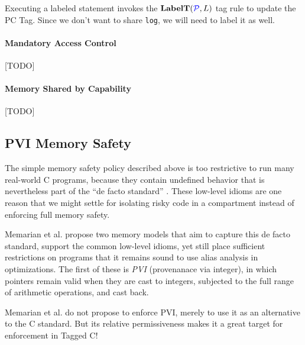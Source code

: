 \documentclass[acmsmall,review,anonymous]{acmart}\settopmatter{printfolios=true,printccs=false,printacmref=false}
\begin{document}
Executing a labeled statement invokes the \(\mathbf{LabelT}(\mathcal{\color{blue} P}, L)\) tag rule to update the PC Tag.
Since we don't want to share {\tt log}, we will need to label it as well.

\paragraph{Mandatory Access Control}

[TODO]

\paragraph{Memory Shared by Capability}

[TODO]

%
\subsection{PVI Memory Safety}
\label{sec:PVI}

The simple memory safety policy described above is too restrictive to run many real-world
C programs, because they contain undefined behavior that is nevertheless part of the
``de facto standard'' \cite{???}. These low-level idioms are one reason that we might
settle for isolating risky code in a compartment instead of enforcing full memory safety.

Memarian et al. \cite{???} propose two memory models that aim to capture this
de facto standard, support the common low-level idioms, yet still place sufficient
restrictions on programs that it remains sound to use alias analysis in optimizations.
The first of these is {\it PVI} (provenanace via integer), in which pointers remain valid
when they are cast to integers, subjected to the full range of arithmetic operations, and
cast back.

Memarian et al. do not propose to enforce PVI, merely to use it as an alternative to the
C standard. But its relative permissiveness makes it a great target for enforcement in Tagged C!
\end{document}
